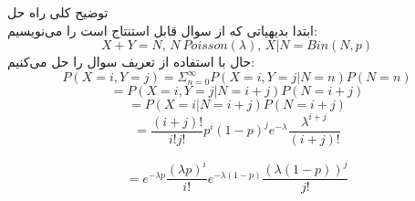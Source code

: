 توضیح کلی راه حل \\
 ابتدا بدیهیاتی که از سوال قابل استنتاج است را می‌نویسیم:
$$
X + Y = N    , \,   N  ~ Poisson(\lambda)  , \,    X|N = Bin(N, p)
$$
حال با استفاده از تعریف سوال را حل می‌کنیم:
$$
P(X = i, Y = j) = \Sigma_{n=0}^{\infty}P(X = i, Y = j | N = n) P(N = n)
$$
$$
 = P(X = i, Y = j| N = i + j) P(N = i + j)
$$
$$
 = P(X = i |  N = i + j) P(N = i + j)
$$
$$
= \dfrac{(i + j)! }{i! j!} p^i (1 - p) ^j e^{-\lambda} \dfrac{\lambda ^ {i + j}}{(i + j) !}
$$

$$
=  e^{-\lambda p}\dfrac{(\lambda p) ^ i}{i!} e^{-\lambda (1 - p)}\dfrac{(\lambda (1 - p)) ^ j}{j!}
$$


